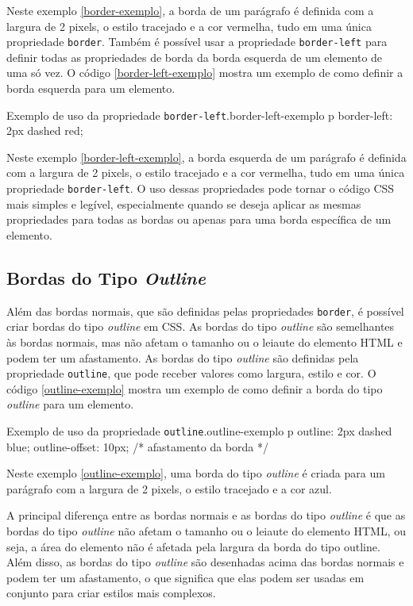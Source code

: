 Neste exemplo \ref{border-exemplo}, a borda de um parágrafo é definida com a largura de 2 pixels, o estilo tracejado e a cor vermelha, tudo em uma única propriedade \texttt{border}. Também é possível usar a propriedade \texttt{border-left} para definir todas as propriedades de borda da borda esquerda de um elemento de uma só vez. O código \ref{border-left-exemplo} mostra um exemplo de como definir a borda esquerda para um elemento.

\begin{csscode}{Exemplo de uso da propriedade \texttt{border-left}.}{border-left-exemplo}
p {
    border-left: 2px dashed red;
}
\end{csscode}

Neste exemplo \ref{border-left-exemplo}, a borda esquerda de um parágrafo é definida com a largura de 2 pixels, o estilo tracejado e a cor vermelha, tudo em uma única propriedade \texttt{border-left}. O uso dessas propriedades pode tornar o código CSS mais simples e legível, especialmente quando se deseja aplicar as mesmas propriedades para todas as bordas ou apenas para uma borda específica de um elemento.

\subsection{Bordas do Tipo \textit{Outline}}

Além das bordas normais, que são definidas pelas propriedades \texttt{border}, é possível criar bordas do tipo \textit{outline} em CSS. As bordas do tipo \textit{outline} são semelhantes às bordas normais, mas não afetam o tamanho ou o leiaute do elemento HTML e podem ter um afastamento. As bordas do tipo \textit{outline} são definidas pela propriedade \texttt{outline}, que pode receber valores como largura, estilo e cor. O código \ref{outline-exemplo} mostra um exemplo de como definir a borda do tipo \textit{outline} para um elemento.

\begin{csscode}{Exemplo de uso da propriedade \texttt{outline}.}{outline-exemplo}
p {
    outline: 2px dashed blue;
    outline-offset: 10px; /* afastamento da borda */
}
\end{csscode}

Neste exemplo \ref{outline-exemplo}, uma borda do tipo \textit{outline} é criada para um parágrafo com a largura de 2 pixels, o estilo tracejado e a cor azul.

A principal diferença entre as bordas normais e as bordas do tipo \textit{outline} é que as bordas do tipo \textit{outline} não afetam o tamanho ou o leiaute do elemento HTML, ou seja, a área do elemento não é afetada pela largura da borda do tipo outline. Além disso, as bordas do tipo \textit{outline} são desenhadas acima das bordas normais e podem ter um afastamento, o que significa que elas podem ser usadas em conjunto para criar estilos mais complexos.

